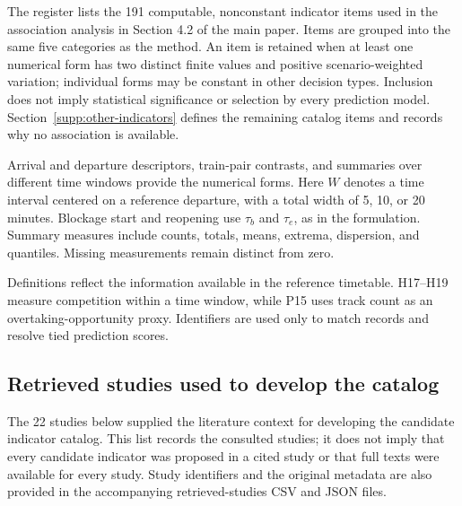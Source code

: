 The register lists the 191 computable, nonconstant indicator items used in the association analysis in Section 4.2 of the main paper. Items are grouped into the same five categories as the method. An item is retained when at least one numerical form has two distinct finite values and positive scenario-weighted variation; individual forms may be constant in other decision types. Inclusion does not imply statistical significance or selection by every prediction model. Section~\ref{supp:other-indicators} defines the remaining catalog items and records why no association is available.

Arrival and departure descriptors, train-pair contrasts, and summaries over different time windows provide the numerical forms. Here $W$ denotes a time interval centered on a reference departure, with a total width of 5, 10, or 20 minutes. Blockage start and reopening use $\tau_b$ and $\tau_e$, as in the formulation. Summary measures include counts, totals, means, extrema, dispersion, and quantiles. Missing measurements remain distinct from zero.

Definitions reflect the information available in the reference timetable. H17--H19 measure competition within a time window, while P15 uses track count as an overtaking-opportunity proxy. Identifiers are used only to match records and resolve tied prediction scores.



\subsection{Retrieved studies used to develop the catalog}
The 22 studies below supplied the literature context for developing the candidate indicator catalog. This list records the consulted studies; it does not imply that every candidate indicator was proposed in a cited study or that full texts were available for every study. Study identifiers and the original metadata are also provided in the accompanying retrieved-studies CSV and JSON files.

